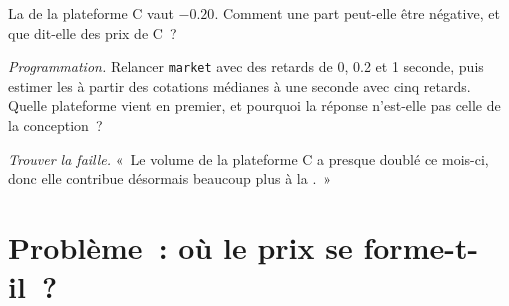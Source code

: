 \begin{exercise}[$\star\star$]\label{exo:mx:fragmentation-and-routing:6}
La  de la plateforme C vaut $-0.20$. Comment une part peut-elle être négative, et que dit-elle des prix de C~?
\end{exercise}

\begin{exercise}[$\star\star\star$]\label{exo:mx:fragmentation-and-routing:7}
\emph{Programmation.} Relancer \texttt{market} avec des retards de 0, 0.2 et 1 seconde, puis estimer les  à partir des cotations médianes à une seconde avec cinq
retards. Quelle plateforme vient en premier, et pourquoi la réponse n'est-elle pas celle de la conception~?
\end{exercise}

\begin{exercise}[$\star\star\star$]\label{exo:mx:fragmentation-and-routing:8}
\emph{Trouver la faille.} «~Le volume de la plateforme C a presque doublé ce mois-ci, donc elle contribue désormais beaucoup plus à la .~»
\end{exercise}

\section{Problème~: où le prix se forme-t-il~?}

